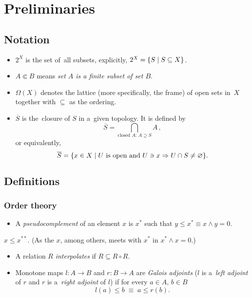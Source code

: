 \chapter{Preliminaries}

\section{Notation}

\begin{itemize}
\item $2^X$ is the set of~all subsets, explicitly, $2^X = \{ S \mid S\subseteq X
\}$.

\item $A \Subset B$ means {\sl set $A$ is a finite subset of set $B$\/}.

\item $\Omega(X)$ denotes the lattice (more specifically, the frame) of open
sets in~$X$ together with $\subseteq$ as the ordering. 

\item $\overline{S}$ is the~closure of $S$ in a~given topology.
It is defined by
\[
  \overline{S} = \bigcap_{ \text{closed } A\colon \, A\supseteq S} A
  \, ,
\]
or equivalently,
\[
  \overline{S} = \{ x \in X \mid U \text{ is open and } U\owns x \Rightarrow U
  \cap S \ne \varnothing \}.
\]

\end{itemize}

\section{Definitions}

\subsection*{Order theory}

\begin{itemize}
\item A \emph{pseudocomplement} of an element $x$ is $x^*$ such that $y \le x^*
\equiv x \wedge y = 0$.
\end{itemize}

\begin{fact}
  $x \le x^{**}$.
  (As the $x$, among others, meets with $x^*$ in $x^* \wedge x = 0$.)
\end{fact}

\begin{itemize}
\item A relation $R$ \emph{interpolates} if $R \subseteq R \circ R$.

\item Monotone maps $l\colon A \to B$ and $r\colon B \to A$ are \emph{Galois
  adjoints\/} ($l$ is a~\emph{left adjoint\/} of $r$ and $r$ is a~\emph{right
  adjoint\/} of $l$) if for every $a\in A, \, b\in B$
  \[
    l(a) \le b \; \equiv \; a \le r(b).
  \]
\end{itemize}


